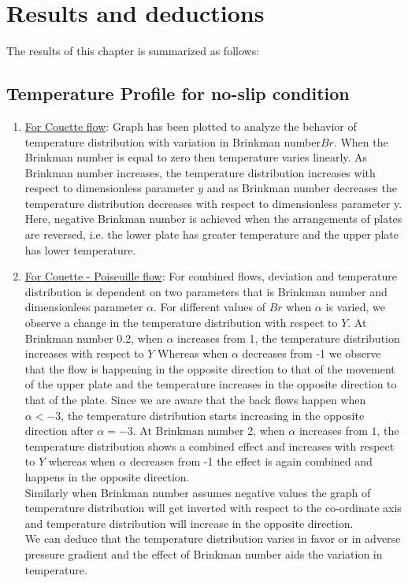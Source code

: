 \documentclass[14pt,one side, a4paper]{extbook}
\begin{document}
	 	\section{Results and deductions} The results of this chapter is summarized as follows:
	 	\subsection{Temperature Profile for no-slip condition}
	 	\begin{enumerate}
	 		\item {\underline{For Couette flow}:}
	 	Graph has been plotted to analyze the behavior of temperature distribution with variation in Brinkman number$Br$. When the Brinkman number is equal to zero then temperature varies linearly. As Brinkman number increases, the temperature distribution increases with respect to dimensionless  parameter $y$ and as Brinkman number decreases the temperature distribution decreases with respect to dimensionless parameter y.
	 	Here, negative Brinkman number is achieved when the arrangements of plates are reversed, i.e.  the lower plate has greater temperature and the upper plate has lower temperature. 
	 	\item{\underline{For Couette - Poiseuille flow}:}
	 	For combined flows, deviation and temperature distribution is dependent on two parameters that is Brinkman number and dimensionless parameter $\alpha$. 
	 	For different values of $Br$ when $\alpha$ is varied, we observe a change in the temperature distribution with respect to $Y$.
	 	At Brinkman number 0.2, when $\alpha$ increases from 1, the temperature distribution increases with respect to $Y$ Whereas when $\alpha$ decreases from -1 we observe that the flow is happening in the opposite direction to that of the movement of the upper plate and the temperature increases in the opposite direction to that of the plate. 
	 	Since we are aware that the back flows happen when $\alpha<-3$, the temperature distribution starts increasing in the opposite direction after $\alpha=-3$.
	 	At Brinkman number 2, when $\alpha$ increases from $1$, the temperature distribution shows a combined effect and increases with respect to $Y$ whereas when $\alpha$ decreases from -1 the effect is again combined and happens in the opposite direction.\\Similarly when Brinkman number assumes negative values the graph of temperature distribution will get inverted with respect to the co-ordinate axis and temperature distribution will increase in the opposite direction. \\We can deduce that the temperature distribution varies in favor or in adverse pressure gradient and the effect of Brinkman number aids the variation in temperature.
	 \end{enumerate}
\end{document}

